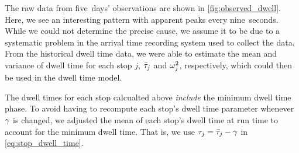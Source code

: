 The raw data from five~days' observations are shown in \cref{fig:observed_dwell}. Here, we see an interesting pattern with apparent peaks every nine~seconds. While we could not determine the precise cause, we assume it to be due to a systematic problem in the arrival time recording system used to collect the data. From the historical dwell time data, we were able to estimate the mean and variance of dwell time for each stop $j$, $\bar{\tau}_j$ and $\omega^2_j$, respectively, which could then be used in the dwell time model.


The dwell times for each stop calcualted above \emph{include} the minimum dwell time phase. To avoid having to recompute each stop's dwell time parameter whenever $\gamma$ is changed, we adjusted the mean of each stop's dwell time at run time to account for the minimum dwell time. That is, we use $\tau_j = \bar{\tau}_j - \gamma$ in \cref{eq:stop_dwell_time}.
